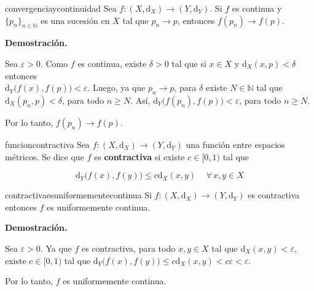 \documentclass[12pt]{article}
\newenvironment{definicion}[1]{\begin{defi}[breakable, pad at break = 5mm, leftrule = 0.7mm, rightrule = 0.7mm, right = 2mm, left = 2mm, enlarge bottom finally by = 3mm]{}{#1}}{\end{defi}}
\newenvironment{ejercicio}[1]{\begin{ejer}[breakable, pad at break = 5mm, leftrule = 0.7mm, rightrule = 0.7mm, right = 2mm, left = 2mm, enlarge bottom finally by = 3mm, fontlower = \setlength{\parskip}{2mm}]{}{#1}}{\end{ejer}}
\newcommand{\paratodo}{\, \forall \,} %
\newcommand{\nat}{\mathbb{N}}
\begin{document}

	\begin{ejercicio}{convergenciaycontinuidad}
		Sea $ f \colon (X, \mathrm{d}_X) \to (Y, \mathrm{d}_Y) $. Si $ f $ es continua y $ \lbrace p_n \rbrace_{n \in \nat} $ es una sucesión en $ X $ tal que $ p_n \to p $, entonces $ f(p_n) \to f(p) $.

		\tcblower

		\textbf{Demostración.}

		Sea $ \varepsilon > 0 $. Como $ f $ es continua, existe $ \delta > 0 $ tal que si $ x \in X $ y $ \mathrm{d}_X(x,p) < \delta $ entonces \\ $ \mathrm{d}_Y \bigl( f(x),f(p) \bigr) < \varepsilon $. Luego, ya que $ p_n \to p $, para $ \delta $ existe $ N \in \nat $ tal que $ \mathrm{d}_X(p_n, p) < \delta $, para todo $ n \geq N $. Así, $ \mathrm{d}_Y \bigl( f(p_n), f(p) \bigr) < \varepsilon $, para todo $ n \geq N $. 

		Por lo tanto, $ f(p_n) \to f(p) $.
	\end{ejercicio}


	\begin{definicion}{funcioncontractiva}
		Sea $ f \colon (X, \mathrm{d}_X) \to (Y, \mathrm{d}_Y) $ una función entre espacios métricos. Se dice que $ f $ es \textbf{contractiva} si existe $ c \in [0,1) $ tal que 

		\begin{equation*}
			\mathrm{d}_Y \bigl( f(x), f(y) \bigr) \leq c \mathrm{d}_X(x,y) \quad \paratodo x, y \in X
		\end{equation*}
	\end{definicion}


	\begin{ejercicio}{contractivaesuniformementecontinua}
		Si $ f \colon (X, \mathrm{d}_X) \to (Y, \mathrm{d}_Y) $ es contractiva entonces $ f $ es uniformemente continua.

		\tcblower

		\textbf{Demostración.}

		Sea $ \varepsilon > 0 $. Ya que $ f $ es contractiva, para todo $ x, y \in X $ tal que $ \mathrm{d}_X(x, y) < \varepsilon $, existe $ c \in [0,1) $ tal que $ \mathrm{d}_Y \bigl( f(x), f(y) \bigr) \leq c \mathrm{d}_X(x,y) < c \varepsilon < \varepsilon $. 

		Por lo tanto, $ f $ es uniformemente continua.
	\end{ejercicio}
\end{document}
